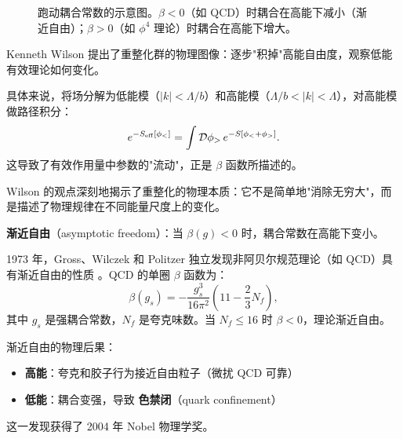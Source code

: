 \begin{figure}[htbp]
\centering
{}
\caption{跑动耦合常数的示意图。$\beta < 0$（如 QCD）时耦合在高能下减小（渐近自由）；$\beta > 0$（如 $\phi^4$ 理论）时耦合在高能下增大。}
\label{fig:running_coupling}
\end{figure}

\begin{remark}
Kenneth Wilson 提出了重整化群的物理图像：逐步"积掉"高能自由度，观察低能有效理论如何变化。

具体来说，将场分解为低能模（$|k| < \Lambda/b$）和高能模（$\Lambda/b < |k| < \Lambda$），对高能模做路径积分：
\begin{equation}
    e^{-S_{\rm eff}[\phi_<]} = \int\mathcal{D}\phi_>\, e^{-S[\phi_<+\phi_>]}.
\end{equation}
这导致了有效作用量中参数的"流动"，正是 $\beta$ 函数所描述的。

Wilson 的观点深刻地揭示了重整化的物理本质：它不是简单地"消除无穷大"，而是描述了物理规律在不同能量尺度上的变化。
\end{remark}


\begin{note}[渐近自由]
\textbf{渐近自由}（asymptotic freedom）：当 $\beta(g) < 0$ 时，耦合常数在高能下变小。

1973 年，Gross、Wilczek 和 Politzer 独立发现非阿贝尔规范理论（如 QCD）具有渐近自由的性质 \cite{Gross1973,Politzer1973}。QCD 的单圈 $\beta$ 函数为：
\begin{equation}
    \beta(g_s) = -\frac{g_s^3}{16\pi^2}\left(11 - \frac{2}{3}N_f\right),
\end{equation}
其中 $g_s$ 是强耦合常数，$N_f$ 是夸克味数。当 $N_f \leq 16$ 时 $\beta < 0$，理论渐近自由。

渐近自由的物理后果：
\begin{itemize}
    \item \textbf{高能}：夸克和胶子行为接近自由粒子（微扰 QCD 可靠）
    \item \textbf{低能}：耦合变强，导致 \textbf{色禁闭}（quark confinement）
\end{itemize}
这一发现获得了 2004 年 Nobel 物理学奖。
\end{note}

